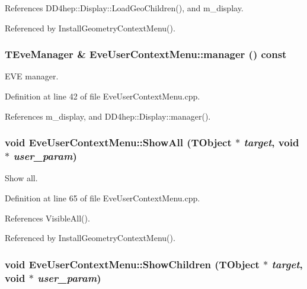 References DD4hep::Display::LoadGeoChildren(), and m\_\-display.

Referenced by InstallGeometryContextMenu().\hypertarget{class_d_d4hep_1_1_eve_user_context_menu_acf19209641571573fae6b6e854ca07ed}{
\subsubsection[{manager}]{\setlength{\rightskip}{0pt plus 5cm}TEveManager \& EveUserContextMenu::manager () const}}
\label{class_d_d4hep_1_1_eve_user_context_menu_acf19209641571573fae6b6e854ca07ed}


EVE manager. 

Definition at line 42 of file EveUserContextMenu.cpp.

References m\_\-display, and DD4hep::Display::manager().\hypertarget{class_d_d4hep_1_1_eve_user_context_menu_a0ee719ceeea4256e11c3381657df7c24}{
\subsubsection[{ShowAll}]{\setlength{\rightskip}{0pt plus 5cm}void EveUserContextMenu::ShowAll ({\bf TObject} $\ast$ {\em target}, \/  void $\ast$ {\em user\_\-param})}}
\label{class_d_d4hep_1_1_eve_user_context_menu_a0ee719ceeea4256e11c3381657df7c24}


Show all. 

Definition at line 65 of file EveUserContextMenu.cpp.

References VisibleAll().

Referenced by InstallGeometryContextMenu().\hypertarget{class_d_d4hep_1_1_eve_user_context_menu_a246160e0e92283c590666845eea452e9}{
\subsubsection[{ShowChildren}]{\setlength{\rightskip}{0pt plus 5cm}void EveUserContextMenu::ShowChildren ({\bf TObject} $\ast$ {\em target}, \/  void $\ast$ {\em user\_\-param})}}
\label{class_d_d4hep_1_1_eve_user_context_menu_a246160e0e92283c590666845eea452e9}


